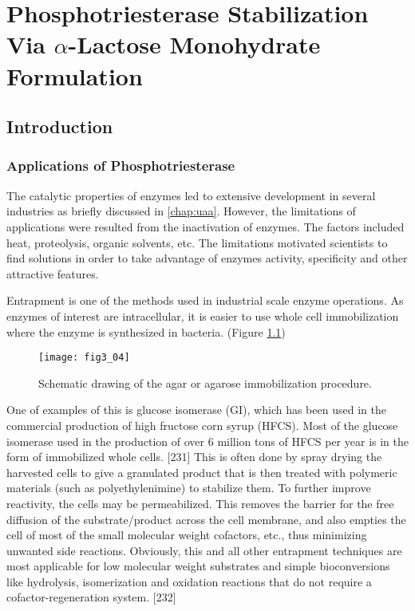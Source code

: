 \chapter{Phosphotriesterase Stabilization Via $\alpha$-Lactose Monohydrate Formulation} 
\label{chap:lactose}

\begin{refsection}

\section{Introduction}

\subsection{Applications of Phosphotriesterase}

The catalytic properties of enzymes led to extensive development in several
industries as briefly discussed in \ref{chap:uaa}. However, the limitations of
applications were resulted from the inactivation of enzymes. The factors
included heat, proteolysis, organic solvents, etc. The limitations motivated
scientists to find solutions in order to take advantage of enzymes activity,
specificity and other attractive features.

Entrapment is one of the methods used in industrial scale enzyme
operations. As enzymes of interest are intracellular, it is easier to use whole cell
immobilization where the enzyme is synthesized in bacteria. \cite{Trelles2013}
(Figure \ref{fig:enzyme-entrapment})

\begin{figure}[h!] \centering \texttt{[image: fig3\_04]}
    \caption[Schematic drawing of the agar or agarose immobilization
    procedure]{Schematic drawing of the agar or agarose immobilization
        procedure.\cite{Trelles2013}}
    \label{fig:enzyme-entrapment} 
\end{figure}

One of examples of this is glucose isomerase (GI), which has been used in the
commercial production of high fructose corn syrup (HFCS).\cite{Bhosale1996} Most of
the glucose isomerase used in the production of over 6 million tons of
HFCS per year is in the form of immobilized whole cells. [231] This is often
done by spray drying the harvested cells to give a granulated product that is
then treated with polymeric materials (such as polyethylenimine) to stabilize
them. To further improve reactivity, the cells may be permeabilized.  This
removes the barrier for the free diffusion of the substrate/product across the
cell membrane, and also empties the cell of most of the small molecular weight
cofactors, etc., thus minimizing unwanted side reactions. Obviously, this and
all other entrapment techniques are most applicable for low molecular weight
substrates and simple bioconversions like hydrolysis, isomerization and
oxidation reactions that do not require a cofactor-regeneration system. [232]


\end{refsection}
